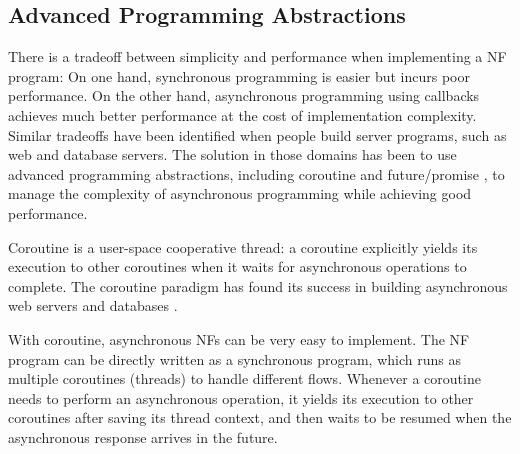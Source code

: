 \subsection{Advanced Programming Abstractions}

There is a tradeoff between simplicity and performance when implementing a NF program: On one hand, synchronous programming is easier but incurs poor performance. On the other hand, asynchronous programming using callbacks achieves much better performance at the cost of implementation complexity. Similar tradeoffs have been identified when people build server programs, such as web \cite{tornado-web-server} and database servers\cite{rethinkdb}.
The solution in those domains has been to use advanced programming abstractions, including coroutine \cite{coroutine} and future/promise \cite{claessen1999poor, li2007combining, wtf, syme2011f}, to manage the complexity of asynchronous programming while achieving good performance.


Coroutine is a user-space cooperative thread: a coroutine explicitly yields its execution to other coroutines when it waits for asynchronous operations to complete. The coroutine paradigm has found its success in building asynchronous web servers \cite{tornado-web-server} and databases \cite{rethinkdb}. %

With coroutine, asynchronous NFs can be very easy to implement. The NF program can be directly written as a synchronous program, which runs as multiple coroutines (threads) to handle different flows. Whenever a coroutine needs to perform an asynchronous operation, it yields its execution to other coroutines after saving its thread context, and then waits to be resumed when the asynchronous response arrives in the future.

